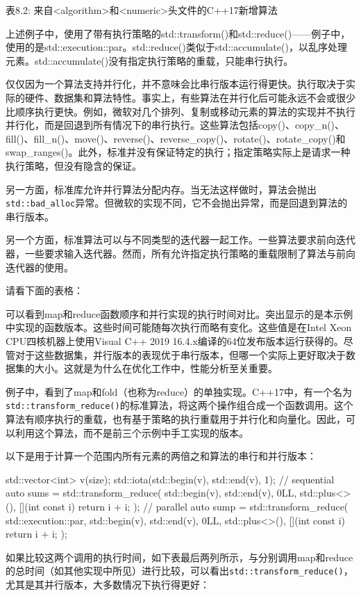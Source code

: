 \begin{center}
表8.2: 来自<algorithm>和<numeric>头文件的C++17新增算法
\end{center}

上述例子中，使用了带有执行策略的std::transform()和std::reduce()——例子中，使用的是std::execution::par。std::reduce()类似于std::accumulate()，以乱序处理元素。std::accumulate()没有指定执行策略的重载，只能串行执行。

\begin{myNotic}
仅仅因为一个算法支持并行化，并不意味会比串行版本运行得更快。执行取决于实际的硬件、数据集和算法特性。事实上，有些算法在并行化后可能永远不会或很少比顺序执行更快。例如，微软对几个排列、复制或移动元素的算法的实现并不执行并行化，而是回退到所有情况下的串行执行。这些算法包括copy()、copy\_n()、fill()、fill\_n()、move()、reverse()、reverse\_copy()、rotate()、rotate\_copy()和swap\_ranges()。此外，标准并没有保证特定的执行；指定策略实际上是请求一种执行策略，但没有隐含的保证。
\end{myNotic}

另一方面，标准库允许并行算法分配内存。当无法这样做时，算法会抛出\verb|std::bad_alloc|异常。但微软的实现不同，它不会抛出异常，而是回退到算法的串行版本。

另一个方面，标准算法可以与不同类型的迭代器一起工作。一些算法要求前向迭代器，一些要求输入迭代器。然而，所有允许指定执行策略的重载限制了算法与前向迭代器的使用。

请看下面的表格：


可以看到map和reduce函数顺序和并行实现的执行时间对比。突出显示的是本示例中实现的函数版本。这些时间可能随每次执行而略有变化。这些值是在Intel Xeon CPU四核机器上使用Visual C++ 2019 16.4.x编译的64位发布版本运行获得的。尽管对于这些数据集，并行版本的表现优于串行版本，但哪一个实际上更好取决于数据集的大小。这就是为什么在优化工作中，性能分析至关重要。


例子中，看到了map和fold（也称为reduce）的单独实现。C++17中，有一个名为\verb|std::transform_reduce()|的标准算法，将这两个操作组合成一个函数调用。这个算法有顺序执行的重载，也有基于策略的执行重载用于并行化和向量化。因此，可以利用这个算法，而不是前三个示例中手工实现的版本。

以下是用于计算一个范围内所有元素的两倍之和算法的串行和并行版本：

\begin{cpp}
std::vector<int> v(size);
std::iota(std::begin(v), std::end(v), 1);
// sequential
auto sums = std::transform_reduce(
    std::begin(v), std::end(v),
    0LL,
    std::plus<>(),
    [](int const i) {return i + i; } );
// parallel
auto sump = std::transform_reduce(
    std::execution::par,
    std::begin(v), std::end(v),
    0LL,
    std::plus<>(),
    [](int const i) {return i + i; });
\end{cpp}


如果比较这两个调用的执行时间，如下表最后两列所示，与分别调用map和reduce的总时间（如其他实现中所见）进行比较，可以看出\verb|std::transform_reduce()|，尤其是其并行版本，大多数情况下执行得更好：


